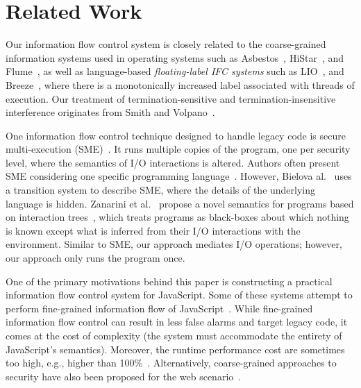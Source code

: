 \section{Related Work}
\label{sec:related}




Our information flow control system is closely related
to the coarse-grained information systems used in operating systems such
as Asbestos~\cite{efstathopoulos:asbestos},
HiStar~\cite{Zeldovich:2006}, and Flume~\cite{krohn:flume}, as well as language-based
\emph{floating-label IFC systems} such as LIO~\cite{lio},
and Breeze~\cite{Hritcu:2013:YIB:2497621.2498098}, where there is a
monotonically increased label
associated with threads of execution.
Our treatment of termination-sensitive and termination-insensitive interference
originates from Smith and Volpano~\cite{Smith:Volpano:MultiThreaded,Volpano:1997:ECF:794197.795081}.

One information flow control technique designed to handle legacy code is
secure multi-execution (SME)~\cite{Devriese:2010}. It runs
multiple copies of the program, one per security level, where the semantics of
I/O interactions is altered. Authors often present
SME considering one specific programming
language~\cite{KULeuven-350547,Rafnson:2013}. However, Bielova
al.~\cite{Biel-etal-11-TR} uses a transition system to describe SME, where the
details of the underlying language is hidden.  Zanarini et
al.~\cite{ZanariniJR13} propose a novel semantics for programs based on
interaction trees~\cite{jacobs-tutorial}, which treats programs as black-boxes
about which nothing is known except what is inferred from their I/O interactions
with the environment. Similar to SME, our approach mediates I/O
operations; however, our approach only runs the program once.


One of the primary motivations behind this paper is constructing a practical
information flow control system for JavaScript.  Some of these systems attempt
to perform fine-grained information flow of
JavaScript~\cite{Hedin:2012,ConDOM,JSFlow}. While fine-grained information flow
control can result in less false alarms and target legacy code, it comes at the
cost of complexity (the system must accommodate the entirety of JavaScript's
semantics). Moreover, the runtime performance cost are sometimes too high, e.g.,
higher than 100\%~\cite{JSFlow}.  Alternatively, coarse-grained
approaches to security have also been proposed for the web
scenario~\cite{Yip:2009:PBS,DeGroef:2012,conf/esorics/AkhaweLHSS13}.


